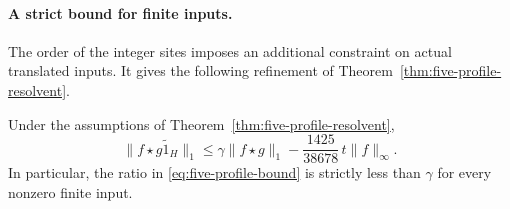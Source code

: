 \paragraph{A strict bound for finite inputs.}
The order of the integer sites imposes an additional constraint on
actual translated inputs.  It gives the following refinement of
Theorem~\ref{thm:five-profile-resolvent}.

\begin{proposition}\label{prop:five-profile-finite-gap}
Under the assumptions of Theorem~\ref{thm:five-profile-resolvent},
\begin{equation}\label{eq:five-profile-finite-gap}
 \|f\star\widetilde{g1_H}\|_1
 \le \gamma\|f\star g\|_1
       -\frac{1425}{38678}\,t\|f\|_\infty.
\end{equation}
In particular, the ratio in \eqref{eq:five-profile-bound} is strictly
less than $\gamma$ for every nonzero finite input.
\end{proposition}

